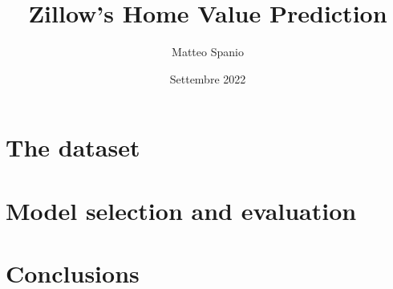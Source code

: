 \documentclass[12pt, twoside]{article}
\title{Zillow’s Home Value Prediction}
\author{Matteo Spanio}
\date{Settembre 2022}
\begin{document}
  

  \onehalfspacing

  \section{The dataset}
     
  

  \section{Model selection and evaluation}

  

  \section{Conclusions}\label{conclusions}
    
  
\end{document}
